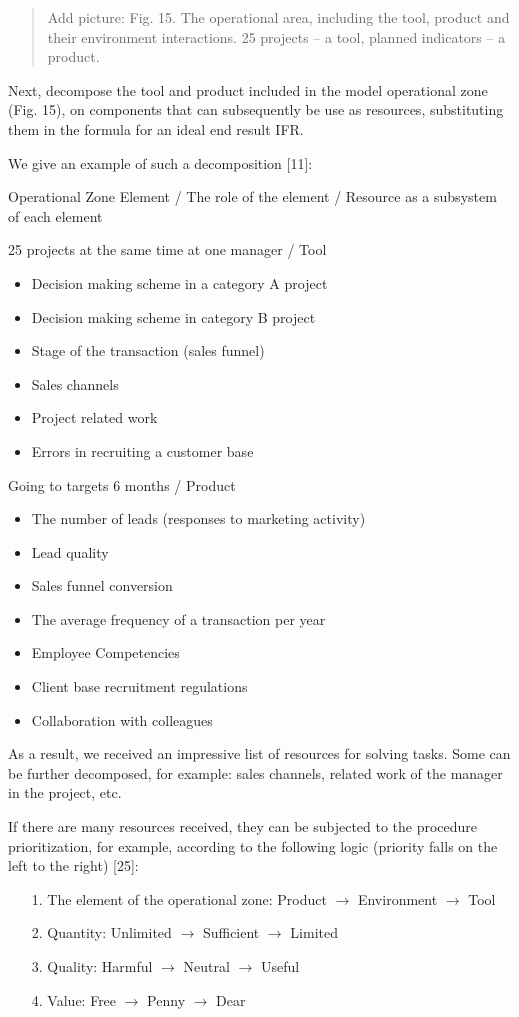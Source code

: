 \documentclass[11pt,a4paper]{book}
\newcommand{\addpicture}[1]{
  \begin{quote} Add picture: #1\end{quote}
}
\begin{document}
\addpicture{Fig. 15. The operational area, including the tool, product and
  their environment interactions. 25 projects -- a tool, planned indicators --
  a product.}

Next, decompose the tool and product included in the model operational zone
(Fig. 15), on components that can subsequently be use as resources,
substituting them in the formula for an ideal end result IFR.

We give an example of such a decomposition [11]:


Operational Zone Element / The role of the element / Resource as a subsystem
of each element

25 projects at the same time at one manager / Tool

\begin{itemize}
\item Decision making scheme in a category A project
\item Decision making scheme in category B project
\item Stage of the transaction (sales funnel)
\item Sales channels
\item Project related work
\item Errors in recruiting a customer base
\end{itemize}

Going to targets 6 months / Product
\begin{itemize}
\item The number of leads (responses to marketing activity)
\item Lead quality
\item Sales funnel conversion
\item The average frequency of a transaction per year
\item Employee Competencies
\item Client base recruitment regulations
\item Collaboration with colleagues
\end{itemize}

As a result, we received an impressive list of resources for solving tasks.
Some can be further decomposed, for example: sales channels, related work of
the manager in the project, etc.

If there are many resources received, they can be subjected to the procedure
prioritization, for example, according to the following logic (priority falls
on the left to the right) [25]:
\begin{itemize}
\item[1.] The element of the operational zone: Product $\to$ Environment $\to$
  Tool
\item[2.] Quantity: Unlimited $\to$ Sufficient $\to$ Limited
\item[3.] Quality: Harmful $\to$ Neutral $\to$ Useful
\item[4.] Value: Free $\to$ Penny $\to$ Dear
\end{itemize}
\end{document}
